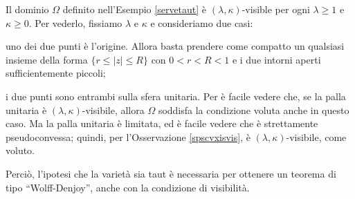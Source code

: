 \begin{ex}
    Il dominio $\Omega$ definito nell'Esempio \ref{servetaut} è $(\lambda,\kappa)$-visible per ogni $\lambda \ge 1$ e $\kappa \ge 0$. Per vederlo, fissiamo $\lambda$ e $\kappa$ e consideriamo due casi:
    \begin{nlist}
        \item uno dei due punti è l'origine. Allora basta prendere come compatto un qualsiasi insieme della forma $\{r \le |z| \le R\}$ con $0<r<R<1$ e i due intorni aperti sufficientemente piccoli;
        \item i due punti sono entrambi sulla sfera unitaria. Per \cite[Proposition 6]{NTT} è facile vedere che, se la palla unitaria è $(\lambda,\kappa)$-visibile, allora $\Omega$ soddisfa la condizione voluta anche in questo caso. Ma la palla unitaria è limitata, ed è facile vedere che è strettamente pseudoconvessa; quindi, per l'Osservazione \ref{spscvxisvis}, è $(\lambda,\kappa)$-visibile, come voluto.
    \end{nlist}
    Perciò, l'ipotesi che la varietà sia taut è necessaria per ottenere un teorema di tipo ``Wolff-Denjoy'', anche con la condizione di visibilità.
\end{ex}